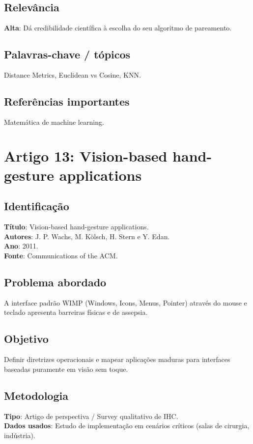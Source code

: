 \documentclass[12pt, a4paper]{article}
\begin{document}
\subsection{Relevância}
\textbf{Alta}: Dá credibilidade científica à escolha do seu algoritmo de pareamento.\\
\subsection{Palavras-chave / tópicos}
Distance Metrics, Euclidean vs Cosine, KNN.\\
\subsection{Referências importantes}
Matemática de machine learning.
\newpage

\section{Artigo 13: Vision-based hand-gesture applications}
\subsection{Identificação}
\textbf{Título}: Vision-based hand-gesture applications.\\
\textbf{Autores}: J. P. Wachs, M. Kölsch, H. Stern e Y. Edan.\\
\textbf{Ano}: 2011.\\
\textbf{Fonte}: Communications of the ACM.\\
\subsection{Problema abordado}
A interface padrão WIMP (Windows, Icons, Menus, Pointer) através do mouse e teclado apresenta barreiras físicas e de assepsia.\\
\subsection{Objetivo}
Definir diretrizes operacionais e mapear aplicações maduras para interfaces baseadas puramente em visão sem toque.\\
\subsection{Metodologia}
\textbf{Tipo}: Artigo de perspectiva / Survey qualitativo de IHC.\\
\textbf{Dados usados}: Estudo de implementação em cenários críticos (salas de cirurgia, indústria).\\
\end{document}
